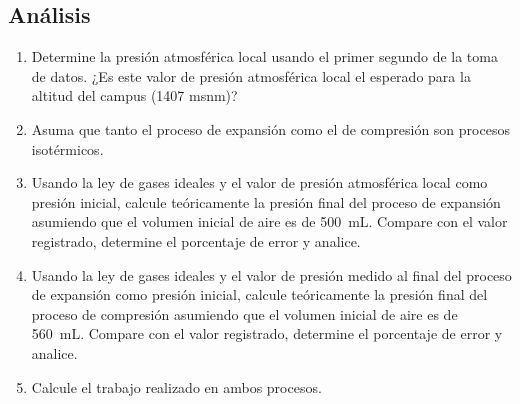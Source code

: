 \subsection{Análisis}
\begin{enumerate}
    \item Determine la presión atmosférica local usando el primer segundo de la toma de datos. ¿Es este valor de presión atmosférica local el esperado para la altitud del campus (1407 msnm)?
    \item Asuma que tanto el proceso de expansión como el de compresión son procesos isotérmicos. 
    \item Usando la ley de gases ideales y el valor de presión atmosférica local como presión inicial, calcule teóricamente la presión final del proceso de expansión asumiendo que el volumen inicial de aire es de \SI{500}{\milli\liter}. Compare con el valor registrado, determine el porcentaje de error y analice.
    \item Usando la ley de gases ideales y el valor de presión medido al final del proceso de expansión como presión inicial, calcule teóricamente la presión final del proceso de compresión asumiendo que el volumen inicial de aire es de \SI{560}{\milli\liter}. Compare con el valor registrado, determine el porcentaje de error y analice.
    \item Calcule el trabajo realizado en ambos procesos.
\end{enumerate}